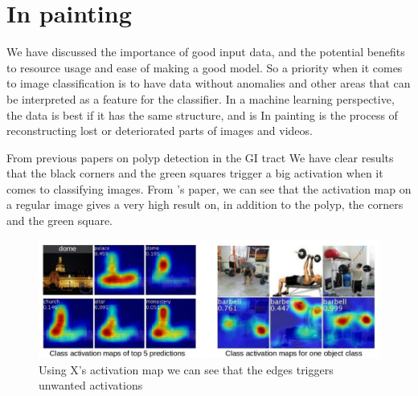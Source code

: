 \section{In painting}
  We have discussed the importance of good input data, and the potential benefits to resource usage and ease of making a good model.
  So a priority when it comes to image classification is to have data without anomalies and other areas that can be interpreted as a feature for the classifier. 
  In a machine learning perspective, the data is best if it has the same structure, and is %
  In painting is the process of reconstructing lost or deteriorated parts of images and videos. %
  

  From previous papers on polyp detection in the GI tract %
We have clear results that the black corners and the green squares trigger a big activation %
  when it comes to classifying images. 
  From %
  's paper, we can see that the activation map on a regular image gives a very high result on, in addition to the polyp, the corners and the green square. 
  \begin{figure}[ht]
    \centering
    \includegraphics[scale=0.5]{background/figures/placeholder.jpeg}
    \caption{Using X's activation map we can see that the edges triggers unwanted activations}
  \end{figure}
  
